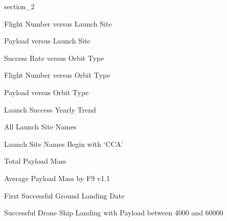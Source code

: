 {
{section_2}
\begin{frame}[plain]
\end{frame}
}

\begin{frame}{Flight Number versus Launch Site}

\end{frame}

\begin{frame}{Payload versus Launch Site}

\end{frame}

\begin{frame}{Success Rate versus Orbit Type}

\end{frame}

\begin{frame}{Flight Number versus Orbit Type}

\end{frame}

\begin{frame}{Payload versus Orbit Type}

\end{frame}

\begin{frame}{Launch Success Yearly Trend}

\end{frame}

\begin{frame}{All Launch Site Names}

\end{frame}

\begin{frame}{Launch Site Names Begin with `CCA'}

\end{frame}

\begin{frame}{Total Payload Mass}

\end{frame}

\begin{frame}{Average Payload Mass by F9 v1.1}

\end{frame}

\begin{frame}{First Successful Ground Landing Date}

\end{frame}

\begin{frame}{Successful Drone Ship Landing with Payload between 4000 and 60000}

\end{frame}

